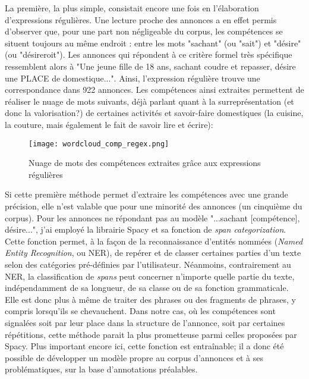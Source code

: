 La première, la plus simple, consistait encore une fois en l'élaboration d'expressions régulières. Une lecture proche des annonces a en effet permis d'observer que, pour une part non négligeable du corpus, les compétences se situent toujours au même endroit : entre les mots "sachant" (ou "sait") et "désire" (ou "désireroit"). Les annonces qui répondent à ce critère formel très spécifique ressemblent alors à "Une jeune fille de 18 ans, sachant coudre et repasser, désire une PLACE de domestique...". Ainsi, l'expression régulière  trouve une correspondance dans 922 annonces. Les compétences ainsi extraites permettent de réaliser le nuage de mots suivants, déjà parlant quant à la surreprésentation (et donc la valorisation?) de certaines activités et savoir-faire domestiques (la cuisine, la couture, mais également le fait de savoir lire et écrire):

\begin{figure}[h]
	\centering
	\texttt{[image: wordcloud\_comp\_regex.png]}
	\caption{Nuage de mots des compétences extraites grâce aux expressions régulières}
\end{figure}

Si cette première méthode permet d'extraire les compétences avec une grande précision, elle n'est valable que pour une minorité des annonces (un cinquième du corpus). Pour les annonces ne répondant pas au modèle "...sachant [compétence], désire...", j'ai employé la librairie Spacy et sa fonction de \textit{span categorization}. Cette fonction permet, à la façon de la reconnaissance d'entités nommées (\textit{Named Entity Recognition}, ou NER), de repérer et de classer certaines parties d'un texte selon des catégories pré-définies par l'utilisateur. Néanmoins, contrairement au NER, la classification de \textit{spans} peut concerner n'importe quelle partie du texte, indépendamment de sa longueur, de sa classe ou de sa fonction grammaticale. Elle est donc plus à même de traiter des phrases ou des fragments de phrases, y compris lorsqu'ils se chevauchent. Dans notre cas, où les compétences sont signalées soit par leur place dans la structure de l'annonce, soit par certaines répétitions, cette méthode parait la plus prometteuse parmi celles proposées par Spacy.  Plus important encore ici, cette fonction est entraînable; il a donc été possible de développer un modèle propre au corpus d'annonces et à ses problématiques, sur la base d'annotations préalables. 



\newpage

